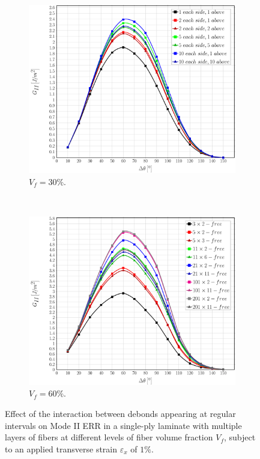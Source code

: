\documentclass[review]{elsarticle}
\begin{document}
\begin{figure}[!h]
\centering
    \begin{subfigure}[b]{0.475\textwidth}
        \includegraphics[width=\textwidth]{sideabovefibers-vf30-GII.pdf}
        \caption{$V_{f}=30\%$.}\label{subfig:sideabovefiber30MII}
    \end{subfigure} ~
   \begin{subfigure}[b]{0.475\textwidth}
        \includegraphics[width=\textwidth]{sideabovefibers-vf60-GII.pdf}
        \caption{$V_{f}=60\%$.}\label{subfig:sideabovefiber60MII}
    \end{subfigure}

\caption{Effect of the interaction between debonds appearing at regular intervals on Mode II ERR in a single-ply laminate with multiple layers of fibers at different levels of fiber volume fraction $V_{f}$, subject to an applied transverse strain $\varepsilon_{x}$ of $1\%$.}\label{fig:sideabovefibersMII}
\end{figure}
\end{document}
